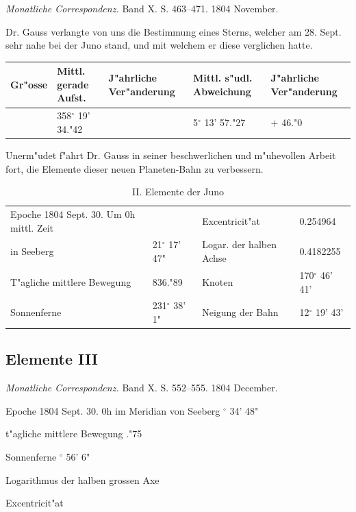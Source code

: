 \documentclass[12pt,a4paper]{article}
\begin{document}
\textit{Monatliche Correspondenz.} Band X. S. 463--471. 1804 November.

Dr. Gauss verlangte von uns die Bestimmung eines Sterns, welcher am 28. Sept. sehr nahe bei der Juno stand, und mit welchem er diese verglichen hatte.

\begin{table}[H]
\centering
\begin{tabular}{l | l | l | l}
\toprule
Gr"osse & Mittl. gerade Aufst. & J"ahrliche Ver"anderung & Mittl. s"udl. Abweichung & J"ahrliche Ver"anderung \\
\midrule
& 358$^\circ$ 19' 34."42 & & 5$^\circ$ 13' 57."27 & $+$ 46."0 \\
\bottomrule
\end{tabular}
\end{table}

Unerm"udet f"ahrt Dr. Gauss in seiner beschwerlichen und m"uhevollen Arbeit fort, die Elemente dieser neuen Planeten-Bahn zu verbessern.

\begin{table}[H]
\centering
\begin{tabular}{l l | l l}
\toprule
Epoche 1804 Sept. 30. Um 0h mittl. Zeit & & Excentricit"at & 0.254964 \\
in Seeberg & 21$^\circ$ 17' 47" & Logar. der halben Achse & 0.4182255 \\
T"agliche mittlere Bewegung & 836."89 & Knoten & 170$^\circ$ 46' 41' \\
Sonnenferne & 231$^\circ$ 38' 1" & Neigung der Bahn & 12$^\circ$ 19' 43' \\
\bottomrule
\end{tabular}
\caption{II. Elemente der Juno}
\end{table}

\subsection{Elemente III}

\textit{Monatliche Correspondenz.} Band X. S. 552--555. 1804 December.

Epoche 1804 Sept. 30. 0h im Meridian von Seeberg $^\circ$ 34' 48"

t"agliche mittlere Bewegung ."75

Sonnenferne $^\circ$ 56' 6"

Logarithmus der halben grossen Axe 

Excentricit"at 
\end{document}
